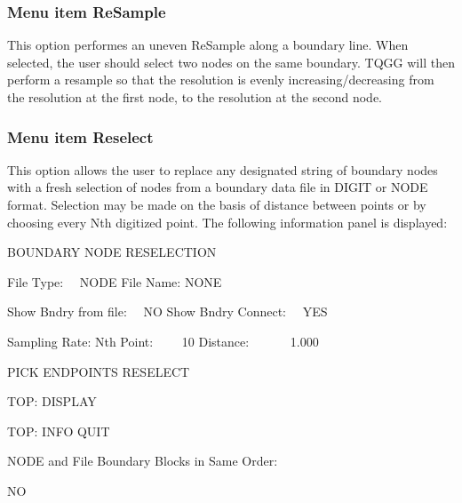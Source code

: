 \documentclass{article}
\begin{document}
\subsubsection[Menu item ReSample]{Menu item ReSample}
This option performes an uneven ReSample along a boundary line. When selected, the user should select two nodes on the same boundary. TQGG will then perform a resample so that the resolution is evenly increasing/decreasing from the resolution at the first node, to the resolution at the second node.

\subsubsection[Menu item Reselect]{Menu item Reselect}

This option allows the user to replace any designated string of boundary nodes with a fresh selection of nodes from a boundary data file in DIGIT or NODE format. Selection may be made on the basis of distance between points or by choosing every Nth digitized point. The following information panel is displayed:

BOUNDARY NODE\newline
RESELECTION


\bigskip

File Type: \ \ NODE\newline
File Name:\newline
NONE \newline

Show Bndry from file: \ \ NO\newline
Show Bndry Connect: \ \ YES

Sampling Rate:\newline
Nth Point: \ \ \ \ 10\newline
Distance: \ \  \ \ \ \ 1.000

PICK ENDPOINTS\newline
RESELECT 

TOP: DISPLAY

TOP: INFO\newline
QUIT


\bigskip

NODE and File Boundary Blocks in Same Order:

NO
\end{document}
